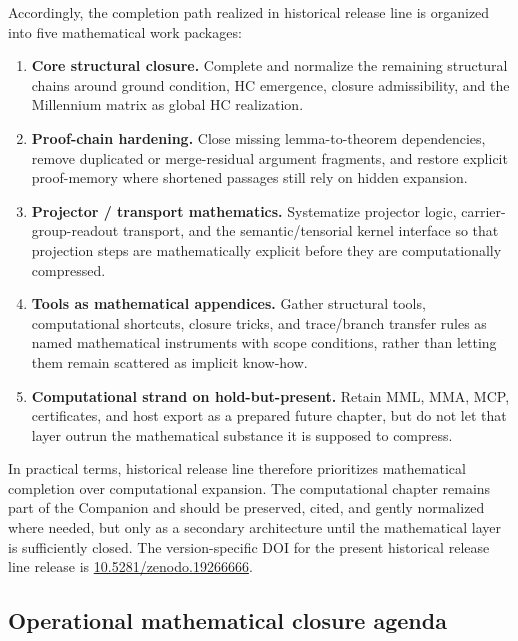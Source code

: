 \documentclass[12pt,a4paper]{article}
\DeclareRobustCommand{\QSCver}[1]{archival stage}
\renewcommand{\QSCver}[1]{historical release line}
\begin{document}
Accordingly, the completion path realized in \QSCver{v2.27.0} is organized into five mathematical work packages:
\begin{enumerate}[leftmargin=2em,label=\textbf{WP\arabic*:}]
 \item \textbf{Core structural closure.} Complete and normalize the remaining structural chains around ground condition, HC emergence, closure admissibility, and the Millennium matrix as global HC realization.
 \item \textbf{Proof-chain hardening.} Close missing lemma-to-theorem dependencies, remove duplicated or merge-residual argument fragments, and restore explicit proof-memory where shortened passages still rely on hidden expansion.
 \item \textbf{Projector / transport mathematics.} Systematize projector logic, carrier-group-readout transport, and the semantic/tensorial kernel interface so that projection steps are mathematically explicit before they are computationally compressed.
 \item \textbf{Tools as mathematical appendices.} Gather structural tools, computational shortcuts, closure tricks, and trace/branch transfer rules as named mathematical instruments with scope conditions, rather than letting them remain scattered as implicit know-how.
 \item \textbf{Computational strand on hold-but-present.} Retain MML, MMA, MCP, certificates, and host export as a prepared future chapter, but do not let that layer outrun the mathematical substance it is supposed to compress.
\end{enumerate}

In practical terms, \QSCver{v2.27.0} therefore prioritizes mathematical completion over computational expansion. The computational chapter remains part of the Companion and should be preserved, cited, and gently normalized where needed, but only as a secondary architecture until the mathematical layer is sufficiently closed. The version-specific DOI for the present \QSCver{v2.27.0} release is \href{https://doi.org/10.5281/zenodo.19266666}{10.5281/zenodo.19266666}.


\subsection*{Operational mathematical closure agenda}
\end{document}
